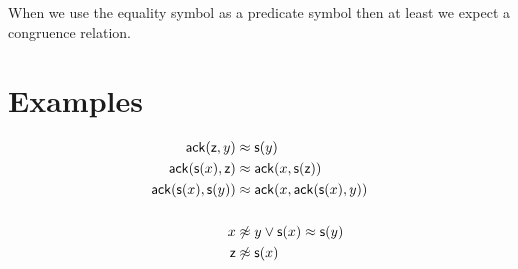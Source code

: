When we use the equality symbol as a predicate symbol 
then at least we expect a congruence relation.

\section{Examples}

\begin{example}
	\begin{align*}
	\mathsf{ack}({\mathsf z},y) &\approx {\mathsf s}(y) \\
	\mathsf{ack}({\mathsf s}(x),{\mathsf z}) &\approx \mathsf{ack}(x, {\mathsf s}({\mathsf z})) \\
	\mathsf{ack}({\mathsf s}(x),{\mathsf s}(y)) &\approx \mathsf{ack}(x, \mathsf{ack}({\mathsf s}(x),y)) \\
	\\
	x &\not\approx y \lor {\mathsf s}(x) \approx {\mathsf s}(y)\\
	{\mathsf z} &\not\approx {\mathsf s}(x)\\
	\end{align*}
\end{example}



